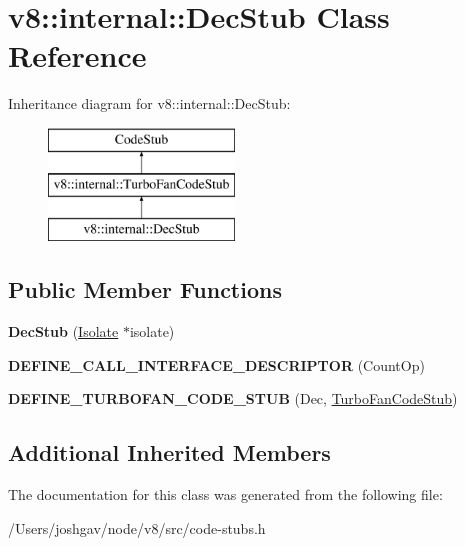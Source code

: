 \hypertarget{classv8_1_1internal_1_1_dec_stub}{}\section{v8\+:\+:internal\+:\+:Dec\+Stub Class Reference}
\label{classv8_1_1internal_1_1_dec_stub}
Inheritance diagram for v8\+:\+:internal\+:\+:Dec\+Stub\+:\begin{figure}[H]
\begin{center}
\leavevmode
\includegraphics[height=3.000000cm]{classv8_1_1internal_1_1_dec_stub}
\end{center}
\end{figure}
\subsection*{Public Member Functions}
\begin{DoxyCompactItemize}
\item 
{\bfseries Dec\+Stub} (\hyperlink{classv8_1_1internal_1_1_isolate}{Isolate} $\ast$isolate)\hypertarget{classv8_1_1internal_1_1_dec_stub_a8c66ad5bd640a0d5e62bc522b1923473}{}\label{classv8_1_1internal_1_1_dec_stub_a8c66ad5bd640a0d5e62bc522b1923473}

\item 
{\bfseries D\+E\+F\+I\+N\+E\+\_\+\+C\+A\+L\+L\+\_\+\+I\+N\+T\+E\+R\+F\+A\+C\+E\+\_\+\+D\+E\+S\+C\+R\+I\+P\+T\+OR} (Count\+Op)\hypertarget{classv8_1_1internal_1_1_dec_stub_a3449e7324b7beb7eb7c42395b9a8fbdf}{}\label{classv8_1_1internal_1_1_dec_stub_a3449e7324b7beb7eb7c42395b9a8fbdf}

\item 
{\bfseries D\+E\+F\+I\+N\+E\+\_\+\+T\+U\+R\+B\+O\+F\+A\+N\+\_\+\+C\+O\+D\+E\+\_\+\+S\+T\+UB} (Dec, \hyperlink{classv8_1_1internal_1_1_turbo_fan_code_stub}{Turbo\+Fan\+Code\+Stub})\hypertarget{classv8_1_1internal_1_1_dec_stub_ae6c69e08afe5ccea4f7947da8c3f002a}{}\label{classv8_1_1internal_1_1_dec_stub_ae6c69e08afe5ccea4f7947da8c3f002a}

\end{DoxyCompactItemize}
\subsection*{Additional Inherited Members}


The documentation for this class was generated from the following file\+:\begin{DoxyCompactItemize}
\item 
/\+Users/joshgav/node/v8/src/code-\/stubs.\+h\end{DoxyCompactItemize}
